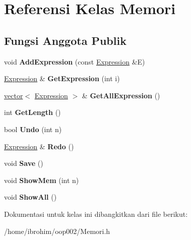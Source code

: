 \hypertarget{classMemori}{}\section{Referensi Kelas Memori}
\label{classMemori}
\subsection*{Fungsi Anggota Publik}
\begin{DoxyCompactItemize}
\item 
\hypertarget{classMemori_a23ded2c06e083765b179044017d4568a}{}void {\bfseries Add\+Expression} (const \hyperlink{classExpression}{Expression} \&E)\label{classMemori_a23ded2c06e083765b179044017d4568a}

\item 
\hypertarget{classMemori_a7a31731f8c96c7d1b88341c8e30f736c}{}\hyperlink{classExpression}{Expression} \& {\bfseries Get\+Expression} (int i)\label{classMemori_a7a31731f8c96c7d1b88341c8e30f736c}

\item 
\hypertarget{classMemori_a1d24e2a91215739281ce457f30daa1de}{}\hyperlink{classvector}{vector}$<$ \hyperlink{classExpression}{Expression} $>$ \& {\bfseries Get\+All\+Expression} ()\label{classMemori_a1d24e2a91215739281ce457f30daa1de}

\item 
\hypertarget{classMemori_a1d60446414aff4f88bc9a478c56fe4c9}{}int {\bfseries Get\+Length} ()\label{classMemori_a1d60446414aff4f88bc9a478c56fe4c9}

\item 
\hypertarget{classMemori_ad992ea2a1b19e5fd131f93bac469bd68}{}bool {\bfseries Undo} (int n)\label{classMemori_ad992ea2a1b19e5fd131f93bac469bd68}

\item 
\hypertarget{classMemori_a023b90b740fb802f5c480ab9057f23b2}{}\hyperlink{classExpression}{Expression} \& {\bfseries Redo} ()\label{classMemori_a023b90b740fb802f5c480ab9057f23b2}

\item 
\hypertarget{classMemori_a50d47e3155b87094ea21706cfc5f3b09}{}void {\bfseries Save} ()\label{classMemori_a50d47e3155b87094ea21706cfc5f3b09}

\item 
\hypertarget{classMemori_a54eee01b6f3e33fbecd84bb8e9f44504}{}void {\bfseries Show\+Mem} (int n)\label{classMemori_a54eee01b6f3e33fbecd84bb8e9f44504}

\item 
\hypertarget{classMemori_a6b3d1bc5a0fd7c61546741ec96ff50ad}{}void {\bfseries Show\+All} ()\label{classMemori_a6b3d1bc5a0fd7c61546741ec96ff50ad}

\end{DoxyCompactItemize}


Dokumentasi untuk kelas ini dibangkitkan dari file berikut\+:\begin{DoxyCompactItemize}
\item 
/home/ibrohim/oop002/Memori.\+h\end{DoxyCompactItemize}
